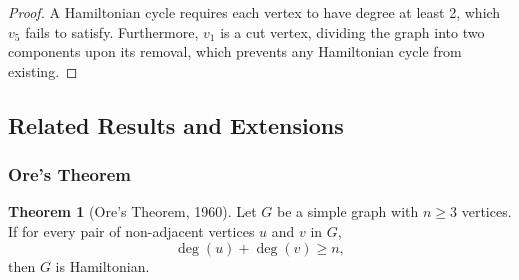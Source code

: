 \documentclass{article}
\theoremstyle{definition}
\newtheorem{theorem}{Theorem}
\begin{document}
\begin{proof}
A Hamiltonian cycle requires each vertex to have degree at least 2, which $v_5$ fails to satisfy. Furthermore, $v_1$ is a cut vertex, dividing the graph into two components upon its removal, which prevents any Hamiltonian cycle from existing.
\end{proof}
\newpage
\subsection{Related Results and Extensions}
\subsubsection{Ore's Theorem}

\begin{theorem}[Ore's Theorem, 1960]
Let $G$ be a simple graph with $n \geq 3$ vertices. If for every pair of non-adjacent vertices $u$ and $v$ in $G$, 
\[\deg(u) + \deg(v) \geq n,\]
then $G$ is Hamiltonian.
\end{theorem}
\end{document}
